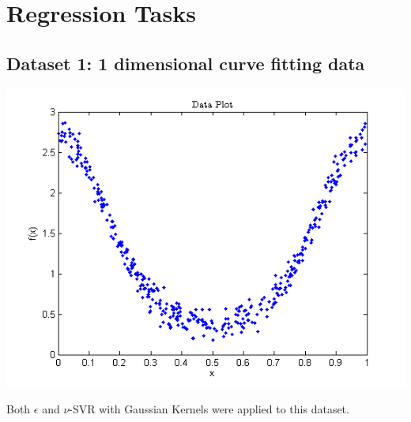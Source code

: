 \documentclass{article}
\begin{document}
\section{Regression Tasks}

\subsection{Dataset 1: 1 dimensional curve fitting data}
\begin{center}
\includegraphics[scale=0.6]{Regression/univar}
\end{center}
Both $\epsilon$ and $\nu$-SVR with Gaussian Kernels were applied to this dataset.
\end{document}
